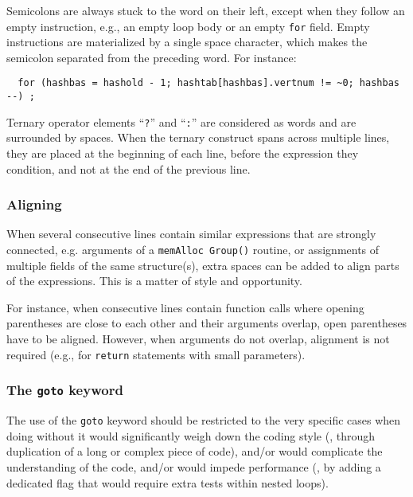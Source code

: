 Semicolons are always stuck to the word on their left, except when
they follow an empty instruction, e.g., an empty loop body or an empty
\texttt{for} field. Empty instructions are materialized by a single
space character, which makes the semicolon separated from the
preceding word. For instance:
\begin{lstlisting}
  for (hashbas = hashold - 1; hashtab[hashbas].vertnum != ~0; hashbas --) ;
\end{lstlisting}

Ternary operator elements ``\texttt{?}'' and ``\texttt{:}'' are
considered as words and are surrounded by spaces. When the ternary
construct spans across multiple lines, they are placed at the
beginning of each line, before the expression they condition, and not
at the end of the previous line.

\subsubsection{Aligning}

When several consecutive lines contain similar expressions that are
strongly connected, e.g. arguments of a \texttt{mem\lbt Alloc\lbt
  Group()} routine, or assignments of multiple fields of the same
structure(s), extra spaces can be added to align parts of the
expressions. This is a matter of style and opportunity.

For instance, when consecutive lines contain function calls where
opening parentheses are close to each other and their arguments
overlap, open parentheses have to be aligned. However, when arguments
do not overlap, alignment is not required (e.g., for \texttt{return}
statements with small parameters).

\subsubsection{The \texttt{goto} keyword}

The use of the \texttt{goto} keyword should be restricted to the very
specific cases when doing without it would significantly weigh down
the coding style (\eg, through duplication of a long or complex piece
of code), and/or would complicate the understanding of the code,
and/or would impede performance (\eg, by adding a dedicated flag that
would require extra tests within nested loops).

